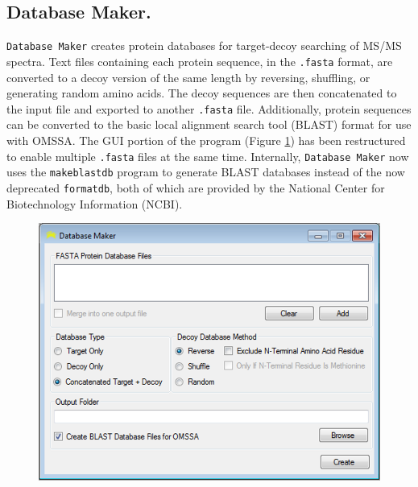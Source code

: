 \subsection*{Database Maker.}
\texttt{Database Maker} creates protein databases for target-decoy searching of MS/MS spectra. Text files containing each protein sequence, in the \texttt{.fasta} format, are converted to a decoy version of the same length by reversing, shuffling, or generating random amino acids.\cite{targetdecoy,targetdecoycomp,qscore} The decoy sequences are then concatenated to the input file and exported to another \texttt{.fasta} file. Additionally, protein sequences can be converted to the basic local alignment search tool (BLAST) format for use with OMSSA.\cite{blast} The GUI portion of the program (Figure \ref{fig:databasemaker}) has been restructured to enable multiple \texttt{.fasta} files at the same time. Internally, \texttt{Database Maker} now uses the \texttt{makeblastdb} program to generate BLAST databases instead of the now deprecated \texttt{formatdb}, both of which are provided by the National Center for Biotechnology Information (NCBI).
\begin{figure}[p]
	\centering
	\includegraphics[width=\columnwidth]{csmsl/databasemaker.png}
	\label{fig:databasemaker}
\end{figure}

